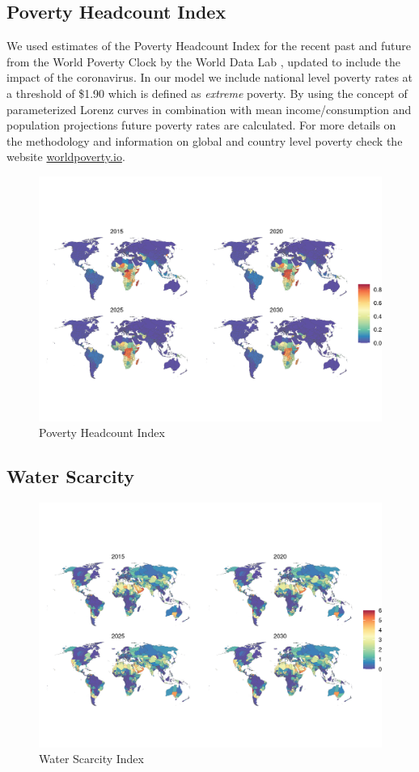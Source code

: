 \documentclass{article}
\begin{document}
\subsection{Poverty Headcount Index}
We used estimates of the Poverty Headcount Index for the recent past and future from the World Poverty Clock by the World Data Lab \citep{Cuaresma2018}, updated to include the impact of the coronavirus. In our model we include national level poverty rates at a threshold of \$1.90 which is defined as \textit{extreme} poverty. By using the concept of parameterized Lorenz curves in combination with mean income/consumption and population projections future poverty rates are calculated. For more details on the methodology and information on global and country level poverty check the website \url{worldpoverty.io}.

\begin{figure}[H]
  \centering
  \includegraphics[width=\linewidth]{img/covars/hci.png}
  \caption{Poverty Headcount Index}
\end{figure}


\subsection{Water Scarcity}
\begin{figure}[H]
  \centering
  \includegraphics[width=\linewidth]{img/covars/wci_index.png}
  \caption{Water Scarcity Index}
\end{figure}
\end{document}
